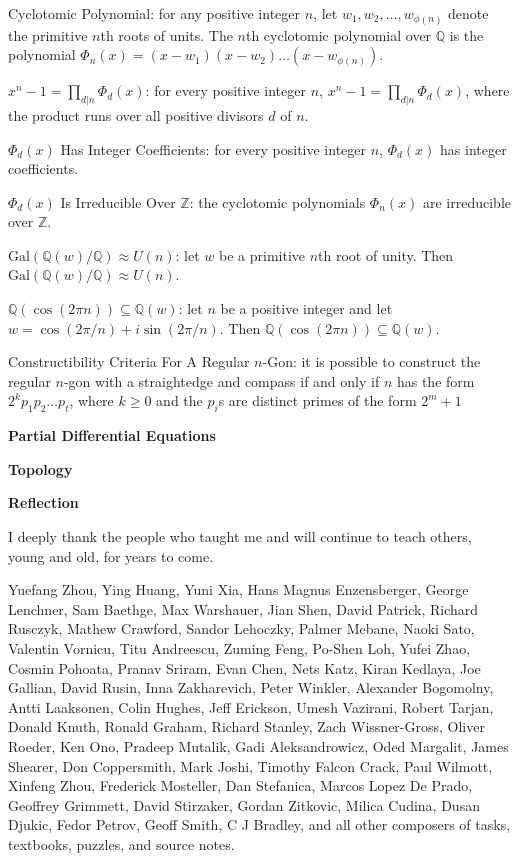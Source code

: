 Cyclotomic Polynomial: for any positive integer $n$, let $w_1,w_2,\dots,w_{\phi (n)}$ denote the primitive $n$th roots of units. The $n$th cyclotomic polynomial over $\mathbb{Q}$ is the polynomial $\Phi_n (x)=(x-w_1)(x-w_2)\dots (x-w_{\phi (n)})$.

$x^n-1=\prod_{d|n} \Phi_d (x)$: for every positive integer $n$, $x^n-1=\prod_{d|n} \Phi_d (x)$, where the product runs over all positive divisors $d$ of $n$.

$\Phi_d (x)$ Has Integer Coefficients: for every positive integer $n$, $\Phi_d (x)$ has integer coefficients.

$\Phi_d (x)$ Is Irreducible Over $\mathbb{Z}$: the cyclotomic polynomials $\Phi_n (x)$ are irreducible over $\mathbb{Z}$.

$\text{Gal}(\mathbb{Q}(w)/\mathbb{Q}) \approx U(n)$: let $w$ be a primitive $n$th root of unity. Then $\text{Gal}(\mathbb{Q}(w)/\mathbb{Q}) \approx U(n)$.

$\mathbb{Q}(\cos(2 \pi n)) \subseteq \mathbb{Q}(w)$: let $n$ be a positive integer and let $w=\cos(2\pi /n) + i\sin(2\pi /n)$. Then $\mathbb{Q}(\cos(2 \pi n)) \subseteq \mathbb{Q}(w)$.

Constructibility Criteria For A Regular $n$-Gon: it is possible to construct the regular $n$-gon with a straightedge and compass if and only if $n$ has the form $2^k p_1p_2\dots p_t$, where $k \ge 0$ and the $p_i$s are distinct primes of the form $2^m+1$

\newpage

\textbf{Partial Differential Equations}



\newpage

\textbf{Topology}



\newpage

\onecolumn

\textbf{Reflection}

I deeply thank the people who taught me and will continue to teach others, young and old, for years to come.

Yuefang Zhou, Ying Huang, Yuni Xia, Hans Magnus Enzensberger, George Lenchner, Sam Baethge, Max Warshauer, Jian Shen, David Patrick, Richard Rusczyk, Mathew Crawford, Sandor Lehoczky, Palmer Mebane, Naoki Sato, Valentin Vornicu, Titu Andreescu, Zuming Feng, Po-Shen Loh, Yufei Zhao, Cosmin Pohoata, Pranav Sriram, Evan Chen, Nets Katz, Kiran Kedlaya, Joe Gallian, David Rusin, Inna Zakharevich, Peter Winkler, Alexander Bogomolny, Antti Laaksonen, Colin Hughes, Jeff Erickson, Umesh Vazirani, Robert Tarjan, Donald Knuth, Ronald Graham, Richard Stanley, Zach Wissner-Gross, Oliver Roeder, Ken Ono, Pradeep Mutalik, Gadi Aleksandrowicz, Oded Margalit, James Shearer, Don Coppersmith, Mark Joshi, Timothy Falcon Crack, Paul Wilmott, Xinfeng Zhou, Frederick Mosteller, Dan Stefanica, Marcos Lopez De Prado, Geoffrey Grimmett, David Stirzaker, Gordan Zitkovic, Milica Cudina, Dusan Djukic, Fedor Petrov, Geoff Smith, C J Bradley, and all other composers of tasks, textbooks, puzzles, and source notes.

